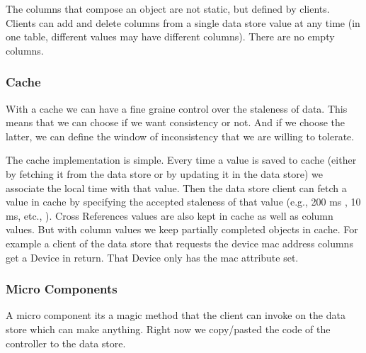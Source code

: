 \documentclass[12pt,openright,twoside]{report}
\begin{document}
The columns that compose an object are not static, but defined by clients. Clients can add and delete columns from a single data store value at any time (in one table, different values may have different columns). There are no empty columns.  





\subsubsection{Cache}
With a cache we can have a fine graine control over the staleness of data. 
This means that we can choose if we want consistency or not.
And if we choose the latter, we can define the window of inconsistency that we are willing to tolerate. 

The cache implementation is simple. 
Every time a value is saved to  cache (either by fetching it from the data store or by updating it in the data store) we associate the local time with that value. 
Then the data store client can fetch a value in cache by specifying the accepted staleness of that value (e.g., 200 ms , 10 ms, etc., ). 
Cross References values are also kept in cache as well as column values. But with column values we  keep partially completed objects in cache. For example a client of the data store that requests the device \gls{mac} address columns get a Device in return.  That Device only has the \gls{mac} attribute set. 

\subsubsection{Micro Components}
A micro component its a magic method that the client can invoke on the data store which can make anything. Right now we copy/pasted the code of the controller to the data store. 


\end{document}
